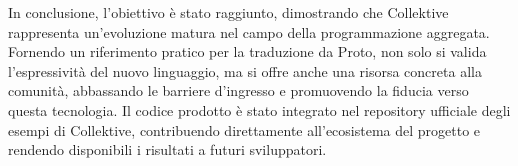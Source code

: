 In conclusione, l'obiettivo è stato raggiunto, dimostrando che Collektive rappresenta un'evoluzione matura nel campo della programmazione aggregata. 
%
Fornendo un riferimento pratico per la traduzione da Proto, non solo si valida l'espressività del nuovo linguaggio, ma si offre anche una risorsa concreta alla comunità, abbassando le barriere d'ingresso e promuovendo la fiducia verso questa tecnologia.
%
Il codice prodotto è stato integrato nel repository ufficiale degli esempi di Collektive, contribuendo direttamente all'ecosistema del progetto e rendendo disponibili i risultati a futuri sviluppatori.